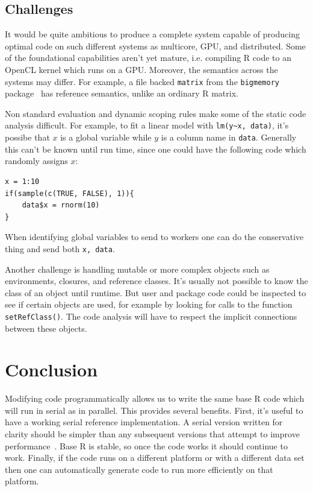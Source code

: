 \documentclass[12pt]{article}
\begin{document}

\subsection{Challenges}

It would be quite ambitious to produce a complete system capable of
producing optimal code on such different systems as multicore, GPU, and
distributed. Some of the foundational capabilities aren't yet mature, i.e.
compiling R code to an OpenCL kernel which runs on a GPU. Moreover, the
semantics across the systems may differ. For example, a file backed
\texttt{matrix} from the \texttt{bigmemory} package~\cite{bigmemory} has reference
semantics, unlike an ordinary R matrix.

Non standard evaluation and dynamic scoping rules make some of the
static code analysis difficult. For example, to fit a linear model with
\texttt{lm(y\textasciitilde x, data)}, it's possibe that $x$ is a global variable while
$y$ is a column name in \texttt{data}. Generally this can't be known until
run time, since one could have the following code which randomly assigns
$x$:

\begin{verbatim}
x = 1:10
if(sample(c(TRUE, FALSE), 1)){
    data$x = rnorm(10)
}
\end{verbatim}

When identifying global variables to send to workers one can do the
conservative thing and send both \texttt{x, data}.

Another challenge is handling mutable or more complex objects
such as environments, closures, and reference classes.  It's usually not
possible to know the class of an object until runtime. But user and package
code could be inspected to see if certain objects are used, for example by
looking for calls to the function \texttt{setRefClass()}. The code
analysis will have to respect the implicit connections between these
objects.

\section{Conclusion}

Modifying code programmatically allows us to write the same base R code
which will run in serial as in parallel. This provides several benefits.
First, it's useful to have a working serial reference implementation.  A
serial version written for clarity should be simpler than any subsequent
versions that attempt to improve performance~\cite{matloff2015parallel}.
Base R is stable, so once the code works it should continue to work.
Finally, if the code runs on a different platform or with a different data
set then one can automatically generate code to run more efficiently on
that platform.
\end{document}
